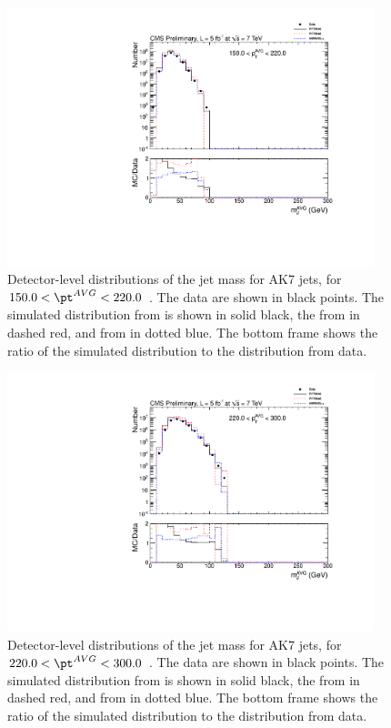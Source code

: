 \ifnpas

\begin{figure}[htbp]
\centering
\includegraphics[width=0.95\textwidth]{figs/histAK7MjetVsPtAvg_rawDataMCComparisons_pt_3}
\caption{Detector-level distributions of the jet mass for AK7 jets,
for $150.0 < \pt^{AVG} < 220.0$ \GeVc. The data are shown in black points.
The simulated distribution from \PYTHIA is shown in solid black, 
the from \PYTHIAEIGHT in dashed red, and from \HERWIG in dotted blue. 
The bottom frame shows the ratio of the simulated distribution
to the distribution from data. 
\label{figs:histAK7MjetVsPtAvg_rawDataMCComparisons_pt_3}}
\end{figure}



\begin{figure}[htbp]
\centering
\includegraphics[width=0.95\textwidth]{figs/histAK7MjetVsPtAvg_rawDataMCComparisons_pt_4}
\caption{Detector-level distributions of the jet mass for AK7 jets,
for $220.0 < \pt^{AVG} < 300.0$ \GeVc. The data are shown in black points.
The simulated distribution from \PYTHIA is shown in solid black, 
the from \PYTHIAEIGHT in dashed red, and from \HERWIG in dotted blue. 
The bottom frame shows the ratio of the simulated distribution
to the distribution from data. 
\label{figs:histAK7MjetVsPtAvg_rawDataMCComparisons_pt_4}}
\end{figure}



